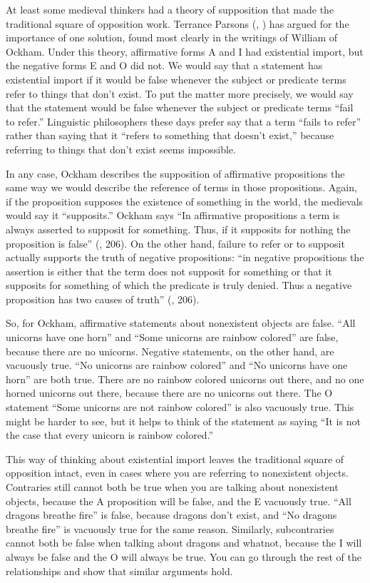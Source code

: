 At least some medieval thinkers had a theory of supposition that made the traditional square of opposition work. Terrance Parsons (\cite*{Parsons1997}, \cite*{Parsons2008})  has argued for the importance of one solution, found most clearly in the writings of William of Ockham. Under this theory, affirmative forms A and I had existential import, but the negative forms E and O did not. We would say that a statement has existential import if it would be false whenever the subject or predicate terms refer to things that don't exist. To put the matter more precisely, we would say that the statement would be false whenever the subject or predicate terms ``fail to refer.'' Linguistic philosophers these days prefer say that a term ``fails to refer'' rather than saying that it ``refers to something that doesn't exist,'' because referring to things that don't exist seems impossible.

In any case, Ockham describes the supposition of affirmative propositions the same way we would describe the reference of terms in those propositions. Again, if the proposition supposes the existence of something in the world, the medievals would say it ``supposits.''  Ockham says ``In affirmative propositions a term is always asserted to supposit for something. Thus, if it supposits for nothing the proposition is false'' (\cite*{Ockham1343}, 206). On the other hand, failure to refer or to supposit actually supports the truth of negative propositions: ``in negative propositions the assertion is either that the term does not supposit for something or that it supposits for something of which the predicate is truly denied. Thus a negative proposition has two causes of truth'' (\cite*{Ockham1343}, 206).

So, for Ockham, affirmative statements about nonexistent objects are false. ``All unicorns have one horn'' and ``Some unicorns are rainbow colored'' are false, because there are no unicorns. Negative statements, on the other hand, are vacuously true. ``No unicorns are rainbow colored'' and ``No unicorns have one horn'' are both true. There are no rainbow colored unicorns out there, and no one horned unicorns out there, because there are no unicorns out there. The O statement ``Some unicorns are not rainbow colored'' is also vacuously true. This might be harder to see, but it helps to think of the statement as saying ``It is not the case that every unicorn is rainbow colored.''

This way of thinking about existential import leaves the traditional square of opposition intact, even in cases where you are referring to nonexistent objects. Contraries still cannot both be true when you are talking about nonexistent objects, because the A proposition will be false, and the E vacuously true. ``All dragons breathe fire'' is false, because dragons don't exist, and ``No dragons breathe fire'' is vacuously true for the same reason. Similarly, subcontraries cannot both be false when talking about dragons and whatnot, because the I will always be false and the O will always be true. You can go through the rest of the relationships and show that similar arguments hold. \label{proving_trad_square}

